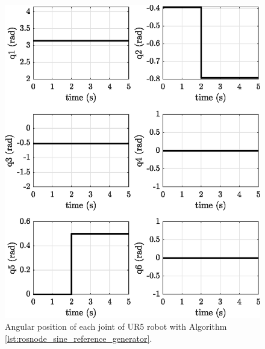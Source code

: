 \begin{figure}
    \centering
    \includegraphics{images/act_1.2/joint_position.eps}
    \caption{Angular position of each joint of UR5 robot with Algorithm \ref{lst:rosnode_sine_reference_generator}.}
    \label{fig:act_1.2_joint_position}
\end{figure}

